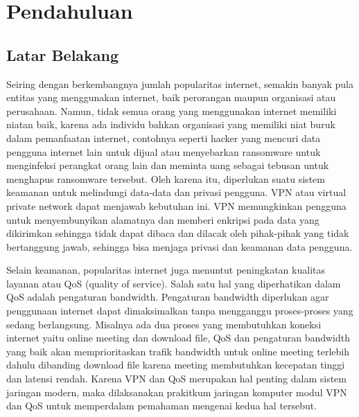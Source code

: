 \section{Pendahuluan}
\subsection{Latar Belakang}
Seiring dengan berkembangnya jumlah popularitas internet, semakin banyak pula entitas yang menggunakan internet, baik perorangan maupun organisasi atau perusahaan. Namun, tidak semua orang yang menggunakan internet memiliki niatan baik, karena ada individu bahkan organisasi yang memiliki niat buruk dalam pemanfaatan internet, contohnya seperti hacker yang mencuri data pengguna internet lain untuk dijual atau menyebarkan ransomware untuk menginfeksi perangkat orang lain dan meminta uang sebagai tebusan untuk menghapus ransomware tersebut. Oleh karena itu, diperlukan suatu sistem keamanan untuk melindungi data-data dan privasi pengguna. VPN atau virtual private network dapat menjawab kebutuhan ini. VPN memungkinkan pengguna untuk menyembunyikan alamatnya dan memberi enkripsi pada data yang dikirimkan sehingga tidak dapat dibaca dan dilacak oleh pihak-pihak yang tidak bertanggung jawab, sehingga bisa menjaga privasi dan keamanan data pengguna.

Selain keamanan, popularitas internet juga menuntut peningkatan kualitas layanan atau QoS (quality of service). Salah satu hal yang diperhatikan dalam QoS adalah pengaturan bandwidth. Pengaturan bandwidth diperlukan agar penggunaan internet dapat dimaksimalkan tanpa mengganggu proses-proses yang sedang berlangsung. Misalnya ada dua proses yang membutuhkan koneksi internet yaitu online meeting dan download file, QoS dan pengaturan bandwidth yang baik akan memprioritaskan trafik bandwidth untuk online meeting terlebih dahulu dibanding download file karena meeting membutuhkan kecepatan tinggi dan latensi rendah. Karena VPN dan QoS merupakan hal penting dalam sistem jaringan modern, maka dilaksanakan prakitkum jaringan komputer modul VPN dan QoS untuk memperdalam pemahaman mengenai kedua hal tersebut.

